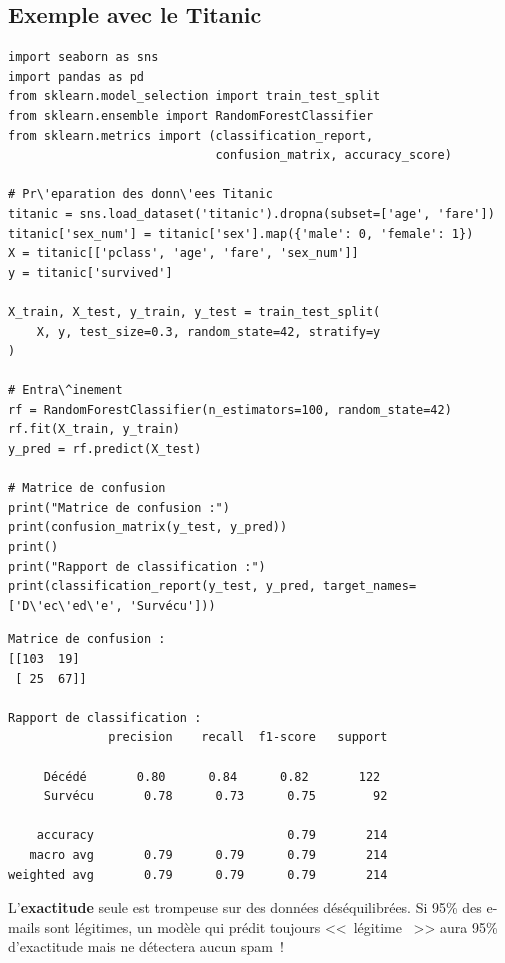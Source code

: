 \subsection{Exemple avec le Titanic}

\begin{codeblock}[title=\textbf{Python}]
\begin{verbatim}
import seaborn as sns
import pandas as pd
from sklearn.model_selection import train_test_split
from sklearn.ensemble import RandomForestClassifier
from sklearn.metrics import (classification_report,
                             confusion_matrix, accuracy_score)

# Pr\'eparation des donn\'ees Titanic
titanic = sns.load_dataset('titanic').dropna(subset=['age', 'fare'])
titanic['sex_num'] = titanic['sex'].map({'male': 0, 'female': 1})
X = titanic[['pclass', 'age', 'fare', 'sex_num']]
y = titanic['survived']

X_train, X_test, y_train, y_test = train_test_split(
    X, y, test_size=0.3, random_state=42, stratify=y
)

# Entra\^inement
rf = RandomForestClassifier(n_estimators=100, random_state=42)
rf.fit(X_train, y_train)
y_pred = rf.predict(X_test)

# Matrice de confusion
print("Matrice de confusion :")
print(confusion_matrix(y_test, y_pred))
print()
print("Rapport de classification :")
print(classification_report(y_test, y_pred, target_names=['D\'ec\'ed\'e', 'Survécu']))
\end{verbatim}
\end{codeblock}

\begin{codeoutput}
\begin{verbatim}
Matrice de confusion :
[[103  19]
 [ 25  67]]

Rapport de classification :
              precision    recall  f1-score   support

     Décédé       0.80      0.84      0.82       122
     Survécu       0.78      0.73      0.75        92

    accuracy                           0.79       214
   macro avg       0.79      0.79      0.79       214
weighted avg       0.79      0.79      0.79       214
\end{verbatim}
\end{codeoutput}

\begin{attention}
L'\textbf{exactitude} seule est trompeuse sur des donn\'ees d\'es\'equilibr\'ees. Si 95\% des e-mails sont l\'egitimes, un mod\`ele qui pr\'edit toujours <<~l\'egitime ~>> aura 95\% d'exactitude mais ne d\'etectera aucun spam~!
\end{attention}

